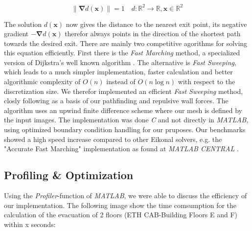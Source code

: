 \documentclass[11pt]{article}
\begin{document}
\begin{equation} \label{eq:eikonal}
\|\mathbf{\nabla} d(\mathbf{x})\|=1 \quad d:\!\mathbb{R}^{2}\to\mathbb{R},\mathbf{x}\in\mathbb{R}^{2}
\end{equation}

The solution $d(\mathbf{x})$ now gives the distance to the nearest exit point, its
negative gradient $-\mathbf{\nabla}d(\mathbf{x})$ therefor always points in the 
direction of the shortest path towards the desired exit. There are mainly two
competitive agorithms for solving this equation efficiently. First there is the
\textit{Fast Marching} method, a specialized version of Dijkstra's well known 
algorithm \cite{dijkstra59a}. The alternative is \textit{Fast Sweeping}, which 
leads to a much simpler implementation, faster calculation and better algorithmic
complexity of $O(n)$ instead of $O(n\log n)$ with respect to the discretization size.
We therefor implemented an efficient \textit{Fast Sweeping} method, closly following
\cite{Zhao04afast} as a basis of our pathfinding and repulsive wall forces. The 
algorithm uses an upwind finite difference scheme where our mesh is defined by 
the input images. The implementation was done \textit{C} and not directly in
\textit{MATLAB}, using optimized boundary condition handling for our pruposes.
Our benchmarks showed a high speed increase compared to other Eikonal solvers,
e.g. the "Accurate Fast Marching" implementation as found at \textit{MATLAB CENTRAL}
\cite{fastmarching}.




\subsection{Profiling \& Optimization}



Using the \textit{Profiler}-function of \textit{MATLAB}, we were able to discuss
the efficiency of our implementation. The following image show the time comsumption
for the calculation of the evacuation of 2 floors (ETH CAB-Building Floors E and F) within x seconds:
\end{document}
